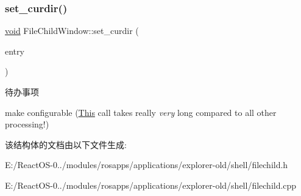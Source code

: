 \subsubsection{\texorpdfstring{set\+\_\+curdir()}{set\_curdir()}}
{\footnotesize\ttfamily \hyperlink{interfacevoid}{void} File\+Child\+Window\+::set\+\_\+curdir (\begin{DoxyParamCaption}\item[{\hyperlink{struct_entry}{Entry} $\ast$}]{entry }\end{DoxyParamCaption})\hspace{0.3cm}{\ttfamily [protected]}}

\begin{DoxyRefDesc}{待办事项}
\item[\hyperlink{todo__todo000029}{待办事项}]make configurable (\hyperlink{namespace_this}{This} call takes really {\itshape very} long compared to all other processing!) \end{DoxyRefDesc}


该结构体的文档由以下文件生成\+:\begin{DoxyCompactItemize}
\item 
E\+:/\+React\+O\+S-\/0../modules/rosapps/applications/explorer-\/old/shell/filechild.\+h\item 
E\+:/\+React\+O\+S-\/0../modules/rosapps/applications/explorer-\/old/shell/filechild.\+cpp\end{DoxyCompactItemize}
